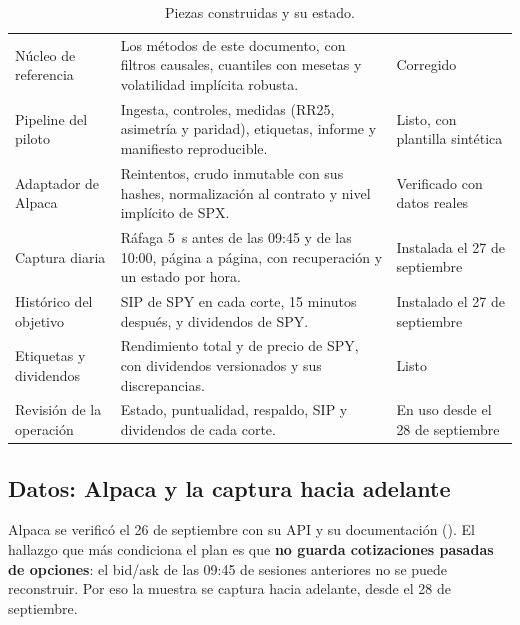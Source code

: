 \begin{table}[H]
\centering\small
\caption{Piezas construidas y su estado.}
\label{tab:construido}
\begin{tabularx}{\linewidth}{@{}>{\RaggedRight}p{3.3cm} Y >{\RaggedRight\arraybackslash}p{3.0cm}@{}}
\toprule
{} &  & \\
\midrule
Núcleo de referencia & Los métodos de este documento, con filtros causales, cuantiles con mesetas y
volatilidad implícita robusta. & Corregido\\
Pipeline del piloto & Ingesta, controles, medidas (RR25, asimetría y paridad), etiquetas, informe y
manifiesto reproducible. & Listo, con plantilla sintética\\
Adaptador de Alpaca & Reintentos, crudo inmutable con sus hashes, normalización al contrato y nivel
implícito de SPX. & Verificado con datos reales\\
Captura diaria & Ráfaga 5~s antes de las 09:45 y de las 10:00, página a página, con recuperación y un
estado por hora. & Instalada el 27 de septiembre\\
Histórico del objetivo & SIP de SPY en cada corte, 15 minutos después, y dividendos de SPY. & Instalado el
27 de septiembre\\
Etiquetas y dividendos & Rendimiento total y de precio de SPY, con dividendos versionados y sus
discrepancias. & Listo\\
Revisión de la operación & Estado, puntualidad, respaldo, SIP y dividendos de cada corte. & En uso desde el
28 de septiembre\\
\bottomrule
\end{tabularx}
\end{table}

\subsection{Datos: Alpaca y la captura hacia adelante}\label{sec:estado_datos}

Alpaca se verificó el 26 de septiembre con su API y su documentación (). El hallazgo que
más condiciona el plan es que \textbf{no guarda cotizaciones pasadas de opciones}: el bid/ask de las 09:45
de sesiones anteriores no se puede reconstruir. Por eso la muestra se captura hacia adelante, desde el 28 de
septiembre.

